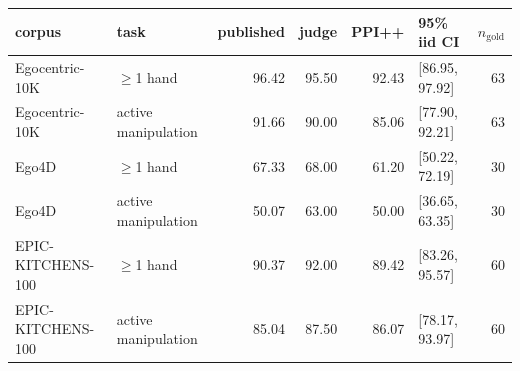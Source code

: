 \begin{tabular}{@{}llrrrlr@{}}
\toprule
corpus & task & published & judge & PPI++ & 95\% iid CI & $n_{\text{gold}}$ \\
\midrule
Egocentric-10K & $\geq$1 hand & 96.42 & 95.50 & 92.43 & [86.95, 97.92] & 63 \\
Egocentric-10K & active manipulation & 91.66 & 90.00 & 85.06 & [77.90, 92.21] & 63 \\
Ego4D & $\geq$1 hand & 67.33 & 68.00 & 61.20 & [50.22, 72.19] & 30 \\
Ego4D & active manipulation & 50.07 & 63.00 & 50.00 & [36.65, 63.35] & 30 \\
EPIC-KITCHENS-100 & $\geq$1 hand & 90.37 & 92.00 & 89.42 & [83.26, 95.57] & 60 \\
EPIC-KITCHENS-100 & active manipulation & 85.04 & 87.50 & 86.07 & [78.17, 93.97] & 60 \\
\bottomrule
\end{tabular}
